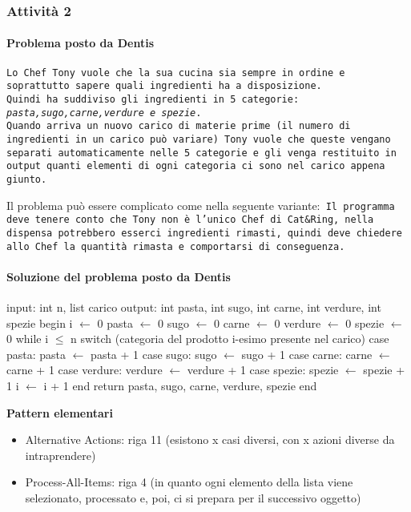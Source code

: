 \documentclass[a4paper]{article}
\begin{document}
\subsubsection{Attività 2}
\paragraph{Problema posto da Dentis}
\texttt{Lo Chef Tony vuole che la sua cucina sia sempre in ordine e soprattutto sapere quali ingredienti ha a disposizione.\\Quindi ha suddiviso gli ingredienti in 5 categorie: \textit{pasta,sugo,carne,verdure e spezie}.\\
Quando arriva un nuovo carico di materie prime (il numero di ingredienti in un carico può variare) Tony vuole che queste vengano separati automaticamente nelle 5 categorie e gli venga restituito in output quanti elementi di ogni categoria ci sono nel carico appena giunto.}

Il problema può essere complicato come nella seguente variante:\texttt{ Il programma deve tenere conto che Tony non è l'unico Chef di Cat\&Ring, nella dispensa potrebbero esserci ingredienti rimasti, quindi deve chiedere allo Chef la quantità rimasta e comportarsi di conseguenza.}
\paragraph{Soluzione del problema posto da Dentis}

\begin{algorithm}[caption={La cucina di Chef Tony (pt.1)}, label={alg1}]
 input: int n, list carico
 output: int pasta, int sugo, int carne, int verdure, int spezie
 begin
   i $\gets$ 0
   pasta $\gets$ 0
   sugo $\gets$ 0
   carne $\gets$ 0
   verdure $\gets$ 0
   spezie $\gets$ 0
   while i $\leq$ n
      switch (categoria del prodotto i-esimo presente nel carico)
        case pasta:
            pasta $\gets$ pasta + 1
        case sugo:
            sugo $\gets$ sugo + 1
        case carne:
            carne $\gets$ carne + 1
        case verdure:
            verdure $\gets$ verdure + 1
        case spezie:
            spezie $\gets$ spezie + 1
      i $\gets$ i + 1
   end
   return pasta, sugo, carne, verdure, spezie
 end
\end{algorithm}

\textbf{Pattern elementari}
\begin{itemize}
	\item Alternative Actions: riga 11 (esistono x casi diversi, con x azioni diverse
da intraprendere) 
	\item Process-All-Items: riga 4 (in quanto ogni elemento della lista viene selezionato, processato e, poi, ci si prepara per il successivo oggetto) 
\end{itemize}
\end{document}
